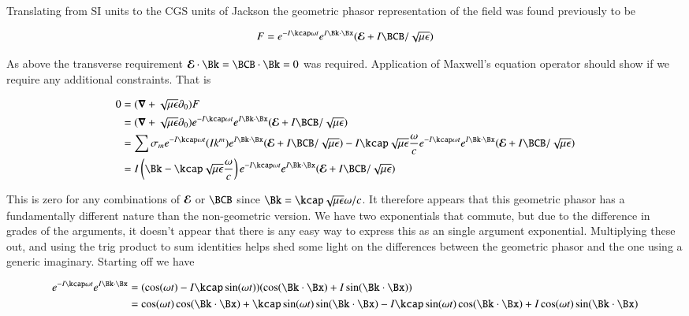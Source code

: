 Translating from SI units to the CGS units of Jackson the geometric phasor representation of the field was found previously to be

\begin{align}\label{eqn:transverseWave:fooE}
F = e^{ -I \kcap \omega t } e^{ I \Bk \cdot \Bx } (\EE + I\BCB/\sqrt{\mu\epsilon})
\end{align}

As above the transverse requirement $\EE \cdot \Bk = \BCB \cdot \Bk = 0$ was required.  Application of Maxwell's equation operator should show if we require any additional constraints.  That is

\begin{align*}
0 
&= (\spacegrad + \sqrt{\mu\epsilon}\partial_0) F \\
&=
(\spacegrad + \sqrt{\mu\epsilon}\partial_0) e^{ -I \kcap \omega t } e^{ I \Bk \cdot \Bx } (\EE + I\BCB/\sqrt{\mu\epsilon}) \\
&=
\sum \sigma_m e^{ -I \kcap \omega t } (I k^m) e^{ I \Bk \cdot \Bx } (\EE + I\BCB/\sqrt{\mu\epsilon}) 
-I \kcap \sqrt{\mu\epsilon} \frac{\omega}{c} e^{ -I \kcap \omega t } e^{ I \Bk \cdot \Bx } (\EE + I\BCB/\sqrt{\mu\epsilon}) \\
&=
I \left(\Bk - \kcap \sqrt{\mu\epsilon} \frac{\omega}{c} \right) e^{ -I \kcap \omega t } e^{ I \Bk \cdot \Bx } (\EE + I\BCB/\sqrt{\mu\epsilon}) 
\end{align*}

This is zero for any combinations of $\boldsymbol{\mathcal{E}}$ or $\BCB$ since $\Bk = \kcap \sqrt{\mu\epsilon} \omega/c$.  It therefore appears that this geometric phasor has a fundamentally different nature than the non-geometric version.  We have two exponentials that commute, but due to the difference in grades of the arguments, it doesn't appear that there is any easy way to express this as an single argument exponential.  Multiplying these out, and using the trig product to sum identities helps shed some light on the differences between the geometric phasor and the one using a generic imaginary.  Starting off we have

\begin{align*}
e^{ -I \kcap \omega t } e^{ I \Bk \cdot \Bx }
&=
(\cos(\omega t) -I\kcap \sin(\omega t)) (\cos(\Bk \cdot \Bx) +I\sin(\Bk \cdot \Bx)) \\
&=
\cos(\omega t)\cos(\Bk \cdot \Bx) 
+ \kcap \sin(\omega t)\sin(\Bk \cdot \Bx)
-I\kcap \sin(\omega t)\cos(\Bk \cdot \Bx)
+I \cos(\omega t) \sin(\Bk \cdot \Bx) \\
\end{align*}

